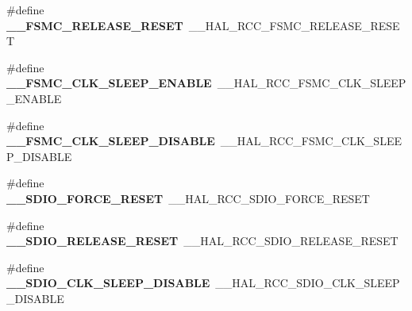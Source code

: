 \begin{DoxyCompactItemize}
\item 
\hypertarget{group___h_a_l___r_c_c___aliased_gab73fd7208de5015546b98b38c5789c6a}{\#define {\bfseries \-\_\-\-\_\-\-F\-S\-M\-C\-\_\-\-R\-E\-L\-E\-A\-S\-E\-\_\-\-R\-E\-S\-E\-T}~\-\_\-\-\_\-\-H\-A\-L\-\_\-\-R\-C\-C\-\_\-\-F\-S\-M\-C\-\_\-\-R\-E\-L\-E\-A\-S\-E\-\_\-\-R\-E\-S\-E\-T}\label{group___h_a_l___r_c_c___aliased_gab73fd7208de5015546b98b38c5789c6a}

\item 
\hypertarget{group___h_a_l___r_c_c___aliased_ga404b58c024eb78288250055809bdfec4}{\#define {\bfseries \-\_\-\-\_\-\-F\-S\-M\-C\-\_\-\-C\-L\-K\-\_\-\-S\-L\-E\-E\-P\-\_\-\-E\-N\-A\-B\-L\-E}~\-\_\-\-\_\-\-H\-A\-L\-\_\-\-R\-C\-C\-\_\-\-F\-S\-M\-C\-\_\-\-C\-L\-K\-\_\-\-S\-L\-E\-E\-P\-\_\-\-E\-N\-A\-B\-L\-E}\label{group___h_a_l___r_c_c___aliased_ga404b58c024eb78288250055809bdfec4}

\item 
\hypertarget{group___h_a_l___r_c_c___aliased_gac9c95b2d35f501bc8c01d3ebe753df84}{\#define {\bfseries \-\_\-\-\_\-\-F\-S\-M\-C\-\_\-\-C\-L\-K\-\_\-\-S\-L\-E\-E\-P\-\_\-\-D\-I\-S\-A\-B\-L\-E}~\-\_\-\-\_\-\-H\-A\-L\-\_\-\-R\-C\-C\-\_\-\-F\-S\-M\-C\-\_\-\-C\-L\-K\-\_\-\-S\-L\-E\-E\-P\-\_\-\-D\-I\-S\-A\-B\-L\-E}\label{group___h_a_l___r_c_c___aliased_gac9c95b2d35f501bc8c01d3ebe753df84}

\item 
\hypertarget{group___h_a_l___r_c_c___aliased_gabe6865d9e0129c9ff78b5972aed8feaa}{\#define {\bfseries \-\_\-\-\_\-\-S\-D\-I\-O\-\_\-\-F\-O\-R\-C\-E\-\_\-\-R\-E\-S\-E\-T}~\-\_\-\-\_\-\-H\-A\-L\-\_\-\-R\-C\-C\-\_\-\-S\-D\-I\-O\-\_\-\-F\-O\-R\-C\-E\-\_\-\-R\-E\-S\-E\-T}\label{group___h_a_l___r_c_c___aliased_gabe6865d9e0129c9ff78b5972aed8feaa}

\item 
\hypertarget{group___h_a_l___r_c_c___aliased_gae34e3c64c3752da61570de340b8e61a8}{\#define {\bfseries \-\_\-\-\_\-\-S\-D\-I\-O\-\_\-\-R\-E\-L\-E\-A\-S\-E\-\_\-\-R\-E\-S\-E\-T}~\-\_\-\-\_\-\-H\-A\-L\-\_\-\-R\-C\-C\-\_\-\-S\-D\-I\-O\-\_\-\-R\-E\-L\-E\-A\-S\-E\-\_\-\-R\-E\-S\-E\-T}\label{group___h_a_l___r_c_c___aliased_gae34e3c64c3752da61570de340b8e61a8}

\item 
\hypertarget{group___h_a_l___r_c_c___aliased_ga5e192ce17bd87c40e3393ad2bd279c0c}{\#define {\bfseries \-\_\-\-\_\-\-S\-D\-I\-O\-\_\-\-C\-L\-K\-\_\-\-S\-L\-E\-E\-P\-\_\-\-D\-I\-S\-A\-B\-L\-E}~\-\_\-\-\_\-\-H\-A\-L\-\_\-\-R\-C\-C\-\_\-\-S\-D\-I\-O\-\_\-\-C\-L\-K\-\_\-\-S\-L\-E\-E\-P\-\_\-\-D\-I\-S\-A\-B\-L\-E}\label{group___h_a_l___r_c_c___aliased_ga5e192ce17bd87c40e3393ad2bd279c0c}


\end{DoxyCompactItemize}
